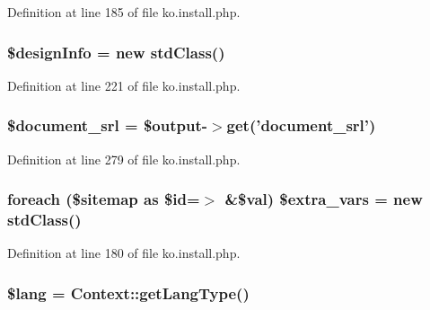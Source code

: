 Definition at line 185 of file ko.\-install.\-php.

\hypertarget{ko_8install_8php_a99e144f7d563ceb76b003d54739b3b0c}{
\subsubsection[{\$design\-Info}]{\setlength{\rightskip}{0pt plus 5cm}\$design\-Info = new std\-Class()}}\label{ko_8install_8php_a99e144f7d563ceb76b003d54739b3b0c}


Definition at line 221 of file ko.\-install.\-php.

\hypertarget{ko_8install_8php_a14522e7fff0604a8372c75b4a0fbc0fd}{
\subsubsection[{\$document\-\_\-srl}]{\setlength{\rightskip}{0pt plus 5cm}\$document\-\_\-srl = \$output-\/$>$get('document\-\_\-srl')}}\label{ko_8install_8php_a14522e7fff0604a8372c75b4a0fbc0fd}


Definition at line 279 of file ko.\-install.\-php.

\hypertarget{ko_8install_8php_a99863a9d4b597491e1a9c801f2e55c0b}{
\subsubsection[{\$extra\-\_\-vars}]{\setlength{\rightskip}{0pt plus 5cm}foreach (\$sitemap as \$id=$>$ \&\$val) \${\bf extra\-\_\-vars} = new std\-Class()}}\label{ko_8install_8php_a99863a9d4b597491e1a9c801f2e55c0b}


Definition at line 180 of file ko.\-install.\-php.

\hypertarget{ko_8install_8php_a7714b111b644017933931ec69a154102}{
\subsubsection[{\$lang}]{\setlength{\rightskip}{0pt plus 5cm}\$lang = {\bf Context\-::get\-Lang\-Type}()}}\label{ko_8install_8php_a7714b111b644017933931ec69a154102}


